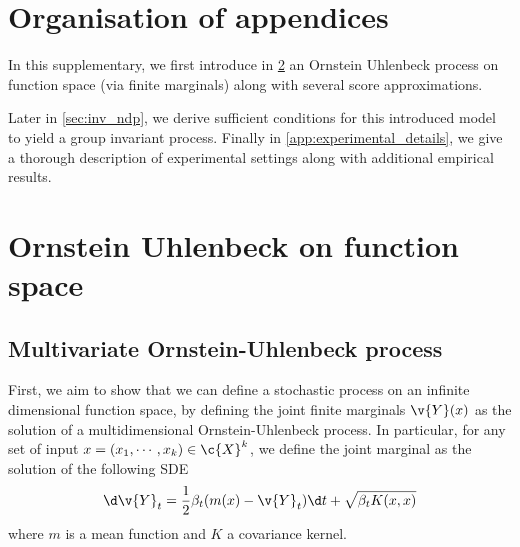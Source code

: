 
\section{Organisation of appendices}
\label{sec:organ_suppl}

In this supplementary, we first introduce in \cref{sec:continuous_process} an Ornstein Uhlenbeck process on function space (via finite marginals) along with several score approximations.

Later in \cref{sec:inv_ndp}, we derive sufficient conditions for this introduced model to yield a group invariant process.
Finally in \cref{app:experimental_details}, we give a thorough description of experimental settings along with additional empirical results.

\section{Ornstein Uhlenbeck on function space} \label{sec:continuous_process}

\subsection{Multivariate Ornstein-Uhlenbeck process}
\label{sec:multivariate_ou}

First, we aim to show that we can define a stochastic process on an infinite dimensional function space, by defining the joint finite marginals $\v{Y}(x)$ as the solution of a multidimensional Ornstein-Uhlenbeck process.
In particular, for any set of input $x = (x_1, \cdots, x_k) \in \c{X}^k$, we define the joint marginal as the solution of the following SDE \begin{equation}\label{eq:app_forward_SDE_sp} 
	\d\v{Y}_t = \frac{1}{2}\beta_t({m}(x) - \v{Y}_t) \d t + \sqrt{\beta_t K(x, x)}
\end{equation}
where \(m\) is a mean function and \(K\) a covariance kernel.

